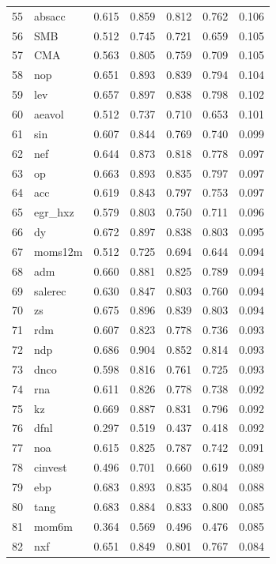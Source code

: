 \documentclass[12pt]{article}
\begin{document}
\begin{footnotesize}
\begin{longtable}{rl|c|c|c|c|c}
		55 & absacc & 0.615 & 0.859 & 0.812 & 0.762 & 0.106 \\ 
		56 & SMB & 0.512 & 0.745 & 0.721 & 0.659 & 0.105 \\ 
		57 & CMA & 0.563 & 0.805 & 0.759 & 0.709 & 0.105 \\ 
		58 & nop & 0.651 & 0.893 & 0.839 & 0.794 & 0.104 \\ 
		59 & lev & 0.657 & 0.897 & 0.838 & 0.798 & 0.102 \\ 
		60 & aeavol & 0.512 & 0.737 & 0.710 & 0.653 & 0.101 \\ 
		61 & sin & 0.607 & 0.844 & 0.769 & 0.740 & 0.099 \\ 
		62 & nef & 0.644 & 0.873 & 0.818 & 0.778 & 0.097 \\ 
		63 & op & 0.663 & 0.893 & 0.835 & 0.797 & 0.097 \\ 
		64 & acc & 0.619 & 0.843 & 0.797 & 0.753 & 0.097 \\ 
		65 & egr\_hxz & 0.579 & 0.803 & 0.750 & 0.711 & 0.096 \\ 
		66 & dy & 0.672 & 0.897 & 0.838 & 0.803 & 0.095 \\ 
		67 & moms12m & 0.512 & 0.725 & 0.694 & 0.644 & 0.094 \\ 
		68 & adm & 0.660 & 0.881 & 0.825 & 0.789 & 0.094 \\ 
		69 & salerec & 0.630 & 0.847 & 0.803 & 0.760 & 0.094 \\ 
		70 & zs & 0.675 & 0.896 & 0.839 & 0.803 & 0.094 \\ 
		71 & rdm & 0.607 & 0.823 & 0.778 & 0.736 & 0.093 \\ 
		72 & ndp & 0.686 & 0.904 & 0.852 & 0.814 & 0.093 \\ 
		73 & dnco & 0.598 & 0.816 & 0.761 & 0.725 & 0.093 \\ 
		74 & rna & 0.611 & 0.826 & 0.778 & 0.738 & 0.092 \\ 
		75 & kz & 0.669 & 0.887 & 0.831 & 0.796 & 0.092 \\ 
		76 & dfnl & 0.297 & 0.519 & 0.437 & 0.418 & 0.092 \\ 
		77 & noa & 0.615 & 0.825 & 0.787 & 0.742 & 0.091 \\ 
		78 & cinvest & 0.496 & 0.701 & 0.660 & 0.619 & 0.089 \\ 
		79 & ebp & 0.683 & 0.893 & 0.835 & 0.804 & 0.088 \\ 
		80 & tang & 0.683 & 0.884 & 0.833 & 0.800 & 0.085 \\ 
		81 & mom6m & 0.364 & 0.569 & 0.496 & 0.476 & 0.085 \\ 
		82 & nxf & 0.651 & 0.849 & 0.801 & 0.767 & 0.084 \\ 

\end{longtable}
\end{footnotesize}
\end{document}
